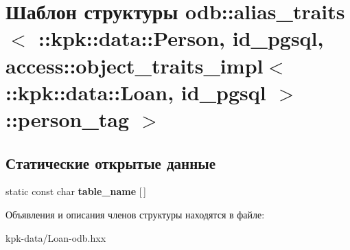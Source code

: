 \hypertarget{structodb_1_1alias__traits_3_01_01_01_01_01_01_01_01_01_01_01_01_01_01_01_01_01_01_1_1kpk_1_1dat1cef4ef17a3e5c3655fedceab7bb5ca2}{}\section{Шаблон структуры odb\+:\+:alias\+\_\+traits$<$ \+:\+:kpk\+:\+:data\+:\+:Person, id\+\_\+pgsql, access\+:\+:object\+\_\+traits\+\_\+impl$<$ \+:\+:kpk\+:\+:data\+:\+:Loan, id\+\_\+pgsql $>$\+:\+:person\+\_\+tag $>$}
\label{structodb_1_1alias__traits_3_01_01_01_01_01_01_01_01_01_01_01_01_01_01_01_01_01_01_1_1kpk_1_1dat1cef4ef17a3e5c3655fedceab7bb5ca2}
\subsection*{Статические открытые данные}
\begin{DoxyCompactItemize}
\item 
static const char {\bfseries table\+\_\+name} \mbox{[}$\,$\mbox{]}\hypertarget{structodb_1_1alias__traits_3_01_01_01_01_01_01_01_01_01_01_01_01_01_01_01_01_01_01_1_1kpk_1_1dat1cef4ef17a3e5c3655fedceab7bb5ca2_ac6113a7388b1bc754cc835939c3d2d2d}{}\label{structodb_1_1alias__traits_3_01_01_01_01_01_01_01_01_01_01_01_01_01_01_01_01_01_01_1_1kpk_1_1dat1cef4ef17a3e5c3655fedceab7bb5ca2_ac6113a7388b1bc754cc835939c3d2d2d}

\end{DoxyCompactItemize}


Объявления и описания членов структуры находятся в файле\+:\begin{DoxyCompactItemize}
\item 
kpk-\/data/Loan-\/odb.\+hxx\end{DoxyCompactItemize}
